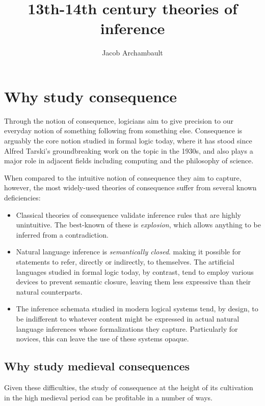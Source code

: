 \documentclass[]{article}
\title{13th-14th century theories of inference}
\author{Jacob Archambault}
\begin{document}
\maketitle

\section{Why study consequence}
Through the notion of consequence, 
logicians aim to give precision to our everyday notion of something following from something else. 
Consequence is arguably the core notion studied in formal logic today, 
where it has stood since Alfred Tarski's groundbreaking work on the topic in the 1930s, 
and also plays a major role in adjacent fields including computing and the philosophy of science. 

When compared to the intuitive notion of consequence they aim to capture, 
however, 
the most widely-used theories of consequence suffer from several known deficiencies: 
\begin{itemize}
	\item Classical theories of consequence validate inference rules that are highly unintuitive. 
	The best-known of these is \emph{explosion}, 
	which allows anything to be inferred from a contradiction.
	\item Natural language inference is \emph{semantically closed}. 
	making it possible for statements to refer, 
	directly or indirectly, 
	to themselves. 
	The artificial languages studied in formal logic today, 
	by contrast, 
	tend to employ various devices to prevent semantic closure, 
	leaving them less expressive than their natural counterparts.
	\item The inference schemata studied in modern logical systems tend, 
	by design, 
	to be indifferent to whatever content might be expressed in actual natural language inferences whose formalizations they capture.
	Particularly for novices, this can leave the use of these systems opaque. 
\end{itemize}

\subsection{Why study medieval consequences}
Given these difficulties, 
the study of consequence at the height of its cultivation in the high medieval period can be profitable in a number of ways. 
\end{document}
